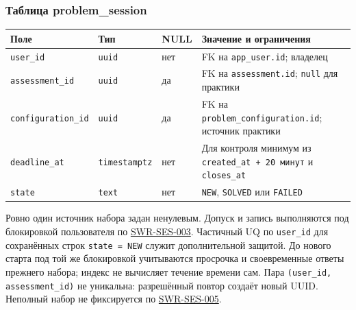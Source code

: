 \documentclass[12pt,a4paper]{article}
\newcounter{none} %
\begin{document}
\hypertarget{личные-сессии-и-задачи}{}

\subsubsection{Таблица problem\_session}\label{ux442ux430ux431ux43bux438ux446ux430-problem_session}

\hypertarget{таблица-problem_session}{}

{\def\LTcaptype{none} %
\begin{longtable}[]{@{}
  >{\raggedright\arraybackslash}p{}
  >{\raggedright\arraybackslash}p{}
  >{\raggedright\arraybackslash}p{}
  >{\raggedright\arraybackslash}p{}@{}}
\toprule\noalign{}
\begin{minipage}[b]{\linewidth}\raggedright
Поле
\end{minipage} & \begin{minipage}[b]{\linewidth}\raggedright
Тип
\end{minipage} & \begin{minipage}[b]{\linewidth}\raggedright
NULL
\end{minipage} & \begin{minipage}[b]{\linewidth}\raggedright
Значение и ограничения
\end{minipage} \\
\midrule\noalign{}
\endhead
\bottomrule\noalign{}
\endlastfoot
\texttt{user\_id} & \texttt{uuid} & нет & FK на \texttt{app\_\allowbreak{}user.\allowbreak{}id}; владелец \\
\texttt{assessment\_\allowbreak{}id} & \texttt{uuid} & да & FK на \texttt{assessment.\allowbreak{}id}; \texttt{null} для практики \\
\texttt{configuration\_\allowbreak{}id} & \texttt{uuid} & да & FK на \texttt{problem\_\allowbreak{}configuration.\allowbreak{}id}; источник практики \\
\texttt{deadline\_\allowbreak{}at} & \texttt{timestamptz} & нет & Для контроля минимум из \texttt{created\_\allowbreak{}at + 20 минут} и \texttt{closes\_at} \\
\texttt{state} & \texttt{text} & нет & \texttt{NEW}, \texttt{SOLVED} или \texttt{FAILED} \\
\end{longtable}
}

Ровно один источник набора задан ненулевым. Допуск и запись выполняются под блокировкой пользователя по {\href{DOC-06.2\_Сессии\_задач\_и\_планировщик.pdf\#swr-ses-003}{SWR-SES-003}}. Частичный UQ по \texttt{user\_id} для сохранённых строк \texttt{state\ =\ NEW} служит дополнительной защитой. До нового старта под той же блокировкой учитываются просрочка и своевременные ответы прежнего набора; индекс не вычисляет течение времени сам. Пара \texttt{(user\_\allowbreak{}id, assessment\_\allowbreak{}id)} не уникальна: разрешённый повтор создаёт новый UUID. Неполный набор не фиксируется по {\href{DOC-06.2\_Сессии\_задач\_и\_планировщик.pdf\#swr-ses-005}{SWR-SES-005}}.
\end{document}
